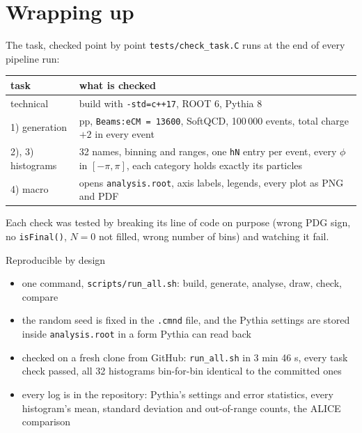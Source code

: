 \documentclass[aspectratio=169,11pt]{beamer}
\begin{document}
\section{Wrapping up}

\begin{frame}{The task, checked point by point}
  \small
  \texttt{tests/check\_task.C} runs at the end of every pipeline run:
  \begin{center}
  \begin{tabular}{lp{}}
    \toprule
    task & what is checked \\
    \midrule
    technical  & build with \texttt{-std=c++17}, ROOT 6, Pythia 8 \\
    1) generation & pp, \texttt{Beams:eCM = 13600}, SoftQCD, 100\,000 events, total charge $+2$ in every event \\
    2), 3) histograms & 32 names, binning and ranges, one \texttt{hN} entry per event, every $\phi$ in $[-\pi, \pi]$,
                        each category holds exactly its particles \\
    4) macro & opens \texttt{analysis.root}, axis labels, legends, every plot as PNG and PDF \\
    \bottomrule
  \end{tabular}
  \end{center}
  Each check was tested by breaking its line of code on purpose (wrong PDG sign, no \texttt{isFinal()},
  $N = 0$ not filled, wrong number of bins) and watching it fail.
\end{frame}

\begin{frame}{Reproducible by design}
  \begin{itemize}
    \item one command, \texttt{scripts/run\_all.sh}: build, generate, analyse, draw, check, compare
    \item the random seed is fixed in the \texttt{.cmnd} file, and the Pythia settings are stored
          inside \texttt{analysis.root} in a form Pythia can read back
    \item checked on a fresh clone from GitHub: \texttt{run\_all.sh} in 3 min 46 s, every task check passed,
          all 32 histograms \alert{bin-for-bin identical} to the committed ones
    \item every log is in the repository: Pythia's settings and error statistics, every histogram's mean,
          standard deviation and out-of-range counts, the ALICE comparison
  \end{itemize}
\end{frame}
\end{document}
